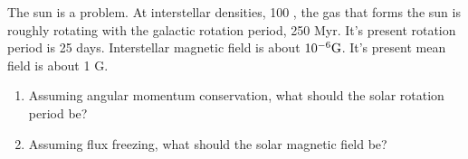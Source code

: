 
     The sun is a problem.  At interstellar densities, 100 \percc, the gas that forms
    the sun is roughly rotating with the galactic rotation period, 250 Myr.
    It's present rotation period is 25 days.  Interstellar magnetic field is
    about $10^{-6}\rm{G}$.  It's present mean field is about 1 G.  
    \begin{enumerate}
    \item {} Assuming angular momentum conservation, what should the solar
    rotation period be?

   \item {} Assuming flux freezing, what should the solar magnetic field
   be?
   \end{enumerate}

